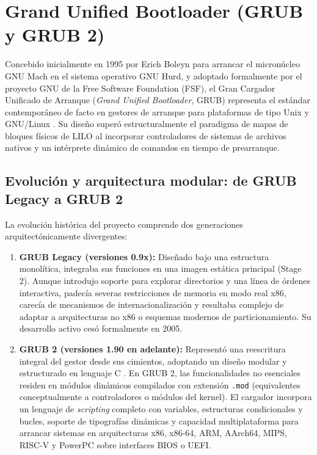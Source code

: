\documentclass[12pt]{article}
\begin{document}
\section{Grand Unified Bootloader (GRUB y GRUB 2)}
\label{sec:grubYGrub2}

Concebido inicialmente en 1995 por Erich Boleyn para arrancar el micronúcleo GNU Mach en el sistema operativo GNU Hurd, y adoptado formalmente por el proyecto GNU de la Free Software Foundation (FSF), el Gran Cargador Unificado de Arranque (\textit{Grand Unified Bootloader}, GRUB) representa el estándar contemporáneo de facto en gestores de arranque para plataformas de tipo Unix y GNU/Linux \parencite{gnugrub2024manual}. Su diseño superó estructuralmente el paradigma de mapas de bloques físicos de LILO al incorporar controladores de sistemas de archivos nativos y un intérprete dinámico de comandos en tiempo de prearranque.

\subsection{Evolución y arquitectura modular: de GRUB Legacy a GRUB 2}
\label{subsec:evolucionGrub}

La evolución histórica del proyecto comprende dos generaciones arquitectónicamente divergentes:
\begin{enumerate}[noitemsep, topsep=2pt]
    \item \textbf{GRUB Legacy (versiones 0.9x):} Diseñado bajo una estructura monolítica, integraba sus funciones en una imagen estática principal (Stage 2). Aunque introdujo soporte para explorar directorios y una línea de órdenes interactiva, padecía severas restricciones de memoria en modo real x86, carecía de mecanismos de internacionalización y resultaba complejo de adaptar a arquitecturas no x86 o esquemas modernos de particionamiento. Su desarrollo activo cesó formalmente en 2005.
    \item \textbf{GRUB 2 (versiones 1.90 en adelante):} Representó una reescritura integral del gestor desde sus cimientos, adoptando un diseño modular y estructurado en lenguaje C \parencite{gnugrub2024manual}. En GRUB 2, las funcionalidades no esenciales residen en módulos dinámicos compilados con extensión \texttt{.mod} (equivalentes conceptualmente a controladores o módulos del kernel). El cargador incorpora un lenguaje de \textit{scripting} completo con variables, estructuras condicionales y bucles, soporte de tipografías dinámicas y capacidad multiplataforma para arrancar sistemas en arquitecturas x86, x86-64, ARM, AArch64, MIPS, RISC-V y PowerPC sobre interfaces BIOS o UEFI.
\end{enumerate}
\end{document}
